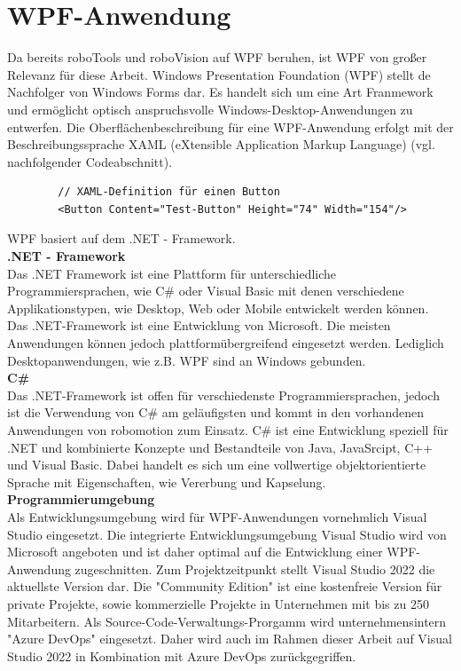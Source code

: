 \documentclass[ a4paper,
                oneside,
                toc=bibliography,
                toc=listof
                ]{scrbook}
\begin{document}
   	\section{WPF-Anwendung}
   	Da bereits roboTools und roboVision auf WPF beruhen, ist WPF von großer Relevanz für diese Arbeit.
   	Windows Presentation Foundation (WPF) stellt de Nachfolger von Windows Forms dar. Es handelt sich um eine Art Franmework und ermöglicht optisch anspruchsvolle Windows-Desktop-Anwendungen zu entwerfen. Die Oberflächenbeschreibung für eine WPF-Anwendung erfolgt mit der Beschreibungssprache XAML (eXtensible Application Markup Language) (vgl. nachfolgender Codeabschnitt). \cite{kotz2022c}
   	\begin{lstlisting}
   		// XAML-Definition für einen Button
   		<Button Content="Test-Button" Height="74" Width="154"/>
   	\end{lstlisting}
   	WPF basiert auf dem .NET - Framework.\\
   	\textbf{.NET - Framework}\\
   	Das .NET Framework ist eine Plattform für unterschiedliche Programmiersprachen, wie C\# oder Visual Basic  mit denen verschiedene Applikationstypen, wie Desktop, Web oder Mobile entwickelt werden können.\\
   	Das .NET-Framework ist eine Entwicklung von Microsoft. Die meisten Anwendungen können jedoch plattformübergreifend eingesetzt werden. Lediglich Desktopanwendungen, wie z.B. WPF sind an Windows gebunden.  \cite{kotz2022c} \cite{troelsen2022pro}\\
   	\textbf{C\#}\\
   	Das .NET-Framework ist offen für verschiedenste Programmiersprachen, jedoch ist die Verwendung von C\# am geläufigsten und kommt in den vorhandenen Anwendungen von robomotion zum Einsatz. C\# ist eine Entwicklung speziell für .NET und kombinierte Konzepte und Bestandteile von Java, JavaSrcipt, C++ und Visual Basic. Dabei handelt es sich um eine vollwertige objektorientierte Sprache mit Eigenschaften, wie Vererbung und Kapselung. \cite{kotz2022c} \cite{troelsen2022pro}\\
   	\textbf{Programmierumgebung}\\
   	Als Entwicklungsumgebung wird für WPF-Anwendungen vornehmlich Visual Studio eingesetzt. Die integrierte Entwicklungsumgebung Visual Studio wird von Microsoft angeboten und ist daher optimal auf die Entwicklung einer WPF-Anwendung zugeschnitten. Zum Projektzeitpunkt stellt Visual Studio 2022 die aktuellste Version dar. Die "Community Edition" ist eine kostenfreie Version für private Projekte, sowie kommerzielle Projekte in Unternehmen mit bis zu 250 Mitarbeitern. \cite{kotz2022c} Als Source-Code-Verwaltungs-Prorgamm wird unternehmensintern "Azure DevOps" eingesetzt. Daher wird auch im Rahmen dieser Arbeit auf Visual Studio 2022 in Kombination mit Azure DevOps zurückgegriffen.\\
   	
\end{document}
